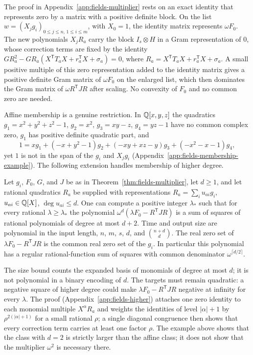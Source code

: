 The proof in Appendix~\ref{app:fields-multiplier} rests on an exact identity
that represents zero by a matrix with a positive definite block. On the list
$w=(X_jg_i)_{0\le j\le n,\,1\le i\le m}$, with $X_0=1$, the identity matrix
represents $\omega F_0$. The new polynomials $X_jR_a$ carry the block
$I_s\otimes H$ in a Gram representation of $0$, whose correction terms are
fixed by the identity
$GR_a^2-GR_a(X^{\mathsf T}T_aX+r_a^{\mathsf T}X+\sigma_a)=0$, where
$R_a=X^{\mathsf T}T_aX+r_a^{\mathsf T}X+\sigma_a$. A small positive multiple of
this zero representation added to the identity matrix gives a positive
definite Gram matrix of $\omega F_0$ on the enlarged list, which then
dominates the Gram matrix of $\omega R^{\mathsf T}JR$ after scaling. No
convexity of $F_0$ and no common zero are needed.

Affine membership is a genuine restriction. In $\mathbb Q[x,y,z]$ the quadratics
$g_1=x^2+y^2+z^2-1$, $g_2=x^2$, $g_3=xy-z$, $g_4=yz-1$ have no common
complex zero, $g_1$ has positive definite quadratic part, and
\[
 1=xg_1+(-x+y^2-1)g_2+(-xy+xz-y)g_3+(-x^2-x-1)g_4 ,
\]
yet $1$ is not in the span of the $g_i$ and $X_jg_i$
(Appendix~\ref{app:fields-membership-example}). The following extension
handles membership of higher degree.

\begin{theorem}
\label{thm:fields-higher-membership}
Let $g_i$, $F_0$, $G$, and $J$ be as in Theorem~\ref{thm:fields-multiplier},
let $d\ge1$, and let rational quadratics $R_a$ be supplied with
representations $R_a=\sum_iu_{ai}g_i$, $u_{ai}\in\mathbb Q[X]$, $\deg u_{ai}\le d$.
One can compute a positive integer $\lambda_*$ such that for every rational
$\lambda\ge\lambda_*$ the polynomial $\omega^d(\lambda F_0-R^{\mathsf T}JR)$
is a sum of squares of rational polynomials of degree at most $d+2$. Time and
output size are polynomial in the input length, $n$, $m$, $s$, $d$, and
$\binom{n+d}d$. The real zero set of $\lambda F_0-R^{\mathsf T}JR$ is the
common real zero set of the $g_i$. In particular this polynomial has a
regular rational-function sum of squares with common denominator
$\omega^{\lceil d/2\rceil}$.
\end{theorem}

The size bound counts the expanded basis of monomials of degree at most $d$;
it is not polynomial in a binary encoding of $d$. The targets must remain
quadratic: a negative square of higher degree could make
$\lambda F_0-R^{\mathsf T}JR$ negative at infinity for every $\lambda$. The
proof (Appendix~\ref{app:fields-higher}) attaches one zero identity to each
monomial multiple $X^\alpha R_a$ and weights the identities of level
$|\alpha|+1$ by $\rho^{2(|\alpha|+1)}$ for a small rational $\rho$; a single
diagonal congruence then shows that every correction term carries at least
one factor $\rho$. The example above shows that the class with $d=2$ is
strictly larger than the affine class; it does not show that the multiplier
$\omega^2$ is necessary there.

